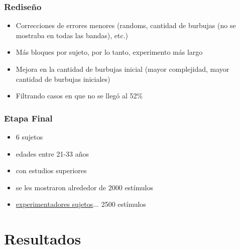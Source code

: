 \documentclass{beamer}
\begin{document}
\begin{frame}
 \frametitle{Rediseño}
\begin{itemize}
 \item Correcciones de errores menores (randoms, cantidad de burbujas (no se mostraba en todas las bandas), etc.)
\item Más bloques por sujeto, por lo tanto, experimento más largo
\item Mejora en la cantidad de burbujas inicial (mayor complejidad, mayor cantidad de burbujas iniciales)
\item Filtrando casos en que no se llegó al 52\%
\end{itemize}

\end{frame}


\begin{frame}
\frametitle{Etapa Final}
\begin{itemize}
\item 6 sujetos
\item edades entre 21-33 años
\item con estudios superiores
\item se les mostraron alrededor de 2000 est\'imulos
\item \underline{experimentadores sujetos}... 2500 est\'imulos
\end{itemize}
\end{frame}

\section{Resultados}
\end{document}
